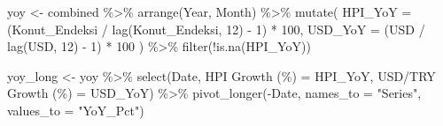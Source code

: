 \documentclass[
  11pt,
  a4paper,
]{article}
\newenvironment{Shaded}{\begin{snugshade}}{\end{snugshade}}
\newcommand{\AttributeTok}[1]{\textcolor[rgb]{0.40,0.45,0.13}{#1}}
\newcommand{\DecValTok}[1]{\textcolor[rgb]{0.68,0.00,0.00}{#1}}
\newcommand{\FunctionTok}[1]{\textcolor[rgb]{0.28,0.35,0.67}{#1}}
\newcommand{\NormalTok}[1]{\textcolor[rgb]{0.00,0.23,0.31}{#1}}
\newcommand{\OtherTok}[1]{\textcolor[rgb]{0.00,0.23,0.31}{#1}}
\newcommand{\SpecialCharTok}[1]{\textcolor[rgb]{0.37,0.37,0.37}{#1}}
\newcommand{\StringTok}[1]{\textcolor[rgb]{0.13,0.47,0.30}{#1}}
\begin{document}
\begin{Shaded}
\begin{Highlighting}[]
\NormalTok{yoy }\OtherTok{\textless{}{-}}\NormalTok{ combined }\SpecialCharTok{\%\textgreater{}\%}
  \FunctionTok{arrange}\NormalTok{(Year, Month) }\SpecialCharTok{\%\textgreater{}\%}
  \FunctionTok{mutate}\NormalTok{(}
    \AttributeTok{HPI\_YoY =}\NormalTok{ (Konut\_Endeksi }\SpecialCharTok{/} \FunctionTok{lag}\NormalTok{(Konut\_Endeksi, }\DecValTok{12}\NormalTok{) }\SpecialCharTok{{-}} \DecValTok{1}\NormalTok{) }\SpecialCharTok{*} \DecValTok{100}\NormalTok{,}
    \AttributeTok{USD\_YoY =}\NormalTok{ (USD }\SpecialCharTok{/} \FunctionTok{lag}\NormalTok{(USD, }\DecValTok{12}\NormalTok{) }\SpecialCharTok{{-}} \DecValTok{1}\NormalTok{) }\SpecialCharTok{*} \DecValTok{100}
\NormalTok{  ) }\SpecialCharTok{\%\textgreater{}\%}
  \FunctionTok{filter}\NormalTok{(}\SpecialCharTok{!}\FunctionTok{is.na}\NormalTok{(HPI\_YoY))}

\NormalTok{yoy\_long }\OtherTok{\textless{}{-}}\NormalTok{ yoy }\SpecialCharTok{\%\textgreater{}\%}
  \FunctionTok{select}\NormalTok{(Date, }\StringTok{\textasciigrave{}}\AttributeTok{HPI Growth (\%)}\StringTok{\textasciigrave{}} \OtherTok{=}\NormalTok{ HPI\_YoY, }\StringTok{\textasciigrave{}}\AttributeTok{USD/TRY Growth (\%)}\StringTok{\textasciigrave{}} \OtherTok{=}\NormalTok{ USD\_YoY) }\SpecialCharTok{\%\textgreater{}\%}
  \FunctionTok{pivot\_longer}\NormalTok{(}\SpecialCharTok{{-}}\NormalTok{Date, }\AttributeTok{names\_to =} \StringTok{"Series"}\NormalTok{, }\AttributeTok{values\_to =} \StringTok{"YoY\_Pct"}\NormalTok{)}


\end{Highlighting}
\end{Shaded}
\end{document}
